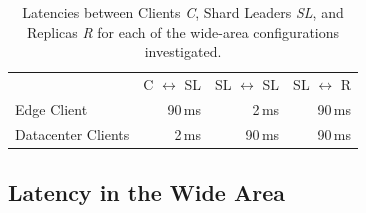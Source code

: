 


\begin{table}[b]
\begin{tabular}{@{}lrrr@{}}
& C $\leftrightarrow$ SL & SL $\leftrightarrow$ SL & SL $\leftrightarrow$ R  \\
Edge Client  & 90\,ms  & 2\,ms & 90\,ms  \\
Datacenter Clients    & 2\,ms & 90\,ms & 90\,ms 
\end{tabular}
\vspace{4pt}
\caption{Latencies between Clients \textit{C}, Shard Leaders \textit{SL}, and Replicas \textit{R} for each of the wide-area configurations investigated.}
\label{table:wan}
\end{table}

\subsection{Latency in the Wide Area}


